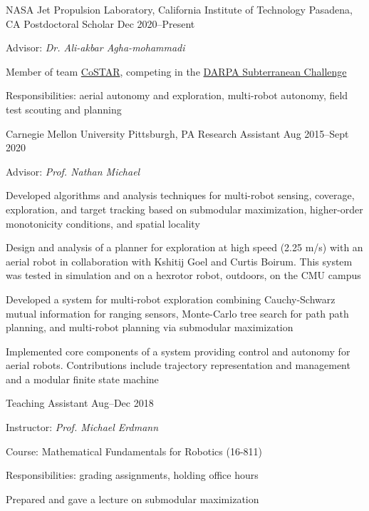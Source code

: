 
\begin{cventries}
  \cventry
  {NASA Jet Propulsion Laboratory, California Institute of Technology}
  {Pasadena, CA}
  {Postdoctoral Scholar}
  {Dec 2020--Present}
  {
    \begin{cvitems}
    \item Advisor: \emph{Dr. Ali-akbar Agha-mohammadi}
    \item Member of team \href{https://costar.jpl.nasa.gov/}{CoSTAR}, competing in the
      \href{https://www.subtchallenge.com/}{DARPA Subterranean Challenge}
    \item Responsibilities:
      aerial autonomy and exploration,
      multi-robot autonomy, field test scouting and planning
    \end{cvitems}
  }
  \cventrytwo
  {Carnegie Mellon University}
  {Pittsburgh, PA}
  {Research Assistant}
  {Aug 2015--Sept 2020}
  {
    \begin{cvitems} %
    \item Advisor: \emph{Prof. Nathan Michael}
    \item Developed algorithms and analysis techniques for multi-robot sensing,
      coverage, exploration, and target tracking based on submodular
      maximization, higher-order monotonicity conditions, and spatial locality
    \item Design and analysis of a planner for exploration at high speed (2.25
      m/s) with an aerial robot in collaboration with Kshitij Goel and Curtis
      Boirum.
      This system was tested in simulation and on a hexrotor robot, outdoors, on
      the CMU campus
    \item Developed a system for multi-robot exploration combining Cauchy-Schwarz
      mutual information for ranging sensors, Monte-Carlo tree search for path
      path planning, and multi-robot planning via submodular maximization
    \item Implemented core components of a system providing control and autonomy
      for aerial robots.
      Contributions include trajectory representation and management and a
      modular finite state machine
    \end{cvitems}
  }
  {Teaching Assistant}
  {Aug--Dec 2018}
  {
    \begin{cvitems} %
    \item Instructor: \emph{Prof. Michael Erdmann}
    \item Course: Mathematical Fundamentals for Robotics (16-811)
    \item Responsibilities: grading assignments, holding office hours
    \item Prepared and gave a lecture on submodular maximization
    \end{cvitems}
  }


\end{cventries}
